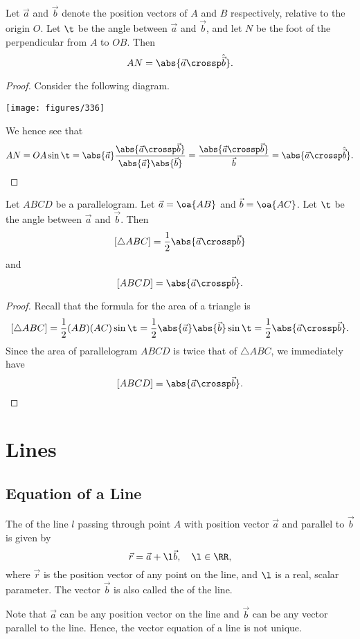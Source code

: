 \begin{proposition}
    Let $\vec a$ and $\vec b$ denote the position vectors of $A$ and $B$ respectively, relative to the origin $O$. Let $\t$ be the angle between $\vec a$ and $\vec b$, and let $N$ be the foot of the perpendicular from $A$ to $OB$. Then \[AN = \abs{\vec a \crossp \hat{\vec b}}.\]
\end{proposition}
\begin{proof}
    Consider the following diagram.
    \begin{center}
        \texttt{[image: figures/336]}
    \end{center}
    We hence see that \[AN = OA \sin \t = \abs{\vec a} \frac{\abs{\vec a \crossp \vec b}}{\abs{\vec a}\abs{\vec b}} = \frac{\abs{\vec a \crossp \vec b}}{\vec b} = \abs{\vec a \crossp \hat{\vec b}}.\]
\end{proof}

\begin{proposition}
    Let $ABCD$ be a parallelogram. Let $\vec a = \oa{AB}$ and $\vec b = \oa{AC}$. Let $\t$ be the angle between $\vec a$ and $\vec b$. Then \[[\triangle ABC] = \frac12 \abs{\vec a \crossp \vec b}\] and \[[ABCD] = \abs{\vec a \crossp \vec b}.\]
\end{proposition}
\begin{proof}
    Recall that the formula for the area of a triangle is \[[\triangle ABC] = \frac12 (AB)(AC) \sin \t = \frac12 \abs{\vec a} \abs{\vec b} \sin \t = \frac12 \abs{\vec a \crossp \vec b}.\] Since the area of parallelogram $ABCD$ is twice that of $\triangle ABC$, we immediately have \[[ABCD] = \abs{\vec a \crossp \vec b}.\]
\end{proof}

\section{Lines}

\subsection{Equation of a Line}

\begin{definition}
    The  of the line $l$ passing through point $A$ with position vector $\vec a$ and parallel to $\vec b$ is given by \[\vec r = \vec a + \l \vec b, \quad \l \in \RR,\] where $\vec r$ is the position vector of any point on the line, and $\l$ is a real, scalar parameter. The vector $\vec b$ is also called the  of the line.
\end{definition}
\begin{remark}
    Note that $\vec a$ can be any position vector on the line and $\vec b$ can be any vector parallel to the line. Hence, the vector equation of a line is not unique.
\end{remark}


